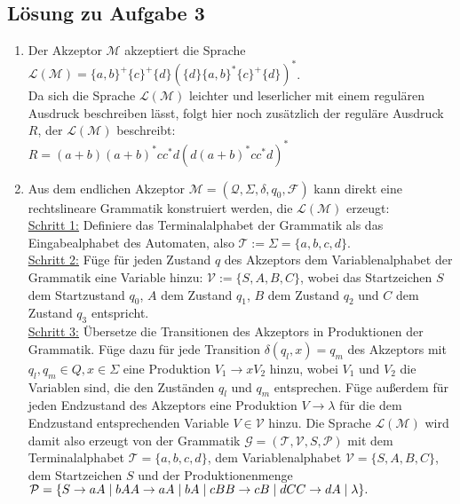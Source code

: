 \documentclass[10pt,oneside,onecolumn,a4paper,german,titlepage]{article}
\begin{document}
\subsection*{Lösung zu Aufgabe 3}
\begin{enumerate}
\item Der Akzeptor $\mathcal{M}$ akzeptiert die Sprache $\mathcal{L}(\mathcal{M}) =
\{a,b\}^+\{c\}^+\{d\}(\{d\}\{a,b\}^*\{c\}^+\{d\})^*$.\\[10pt]
Da sich die Sprache $\mathcal{L}(\mathcal{M})$ leichter und leserlicher mit einem
regulären Ausdruck beschreiben lässt, folgt hier noch zusätzlich der reguläre
Ausdruck $R$, der $\mathcal{L}(\mathcal{M})$ beschreibt:\\
$R = (a+b)(a+b)^*cc^*d(d(a+b)^*cc^*d)^*$

\item Aus dem endlichen Akzeptor $\mathcal{M} = (\mathcal{Q},\Sigma,\delta,q_0,
\mathcal{F})$ kann direkt eine rechtslineare Grammatik konstruiert werden, die
$\mathcal{L}(\mathcal{M})$ erzeugt:\\
\underline{Schritt 1:} Definiere  das Terminalalphabet der Grammatik als das
Eingabealphabet des Automaten, also $\mathcal{T} := \Sigma = \{a,b,c,d\}$.\\
\underline{Schritt 2:} Füge für jeden Zustand $q$ des Akzeptors dem Variablenalphabet
der Grammatik eine Variable hinzu: $\mathcal{V} := \{S,A,B,C\}$, wobei das
Startzeichen $S$ dem Startzustand $q_0$, $A$ dem Zustand $q_1$, $B$ dem Zustand $q_2$
und $C$ dem Zustand $q_3$ entspricht.\\
\underline{Schritt 3:} Übersetze die Transitionen des Akzeptors in Produktionen der
Grammatik. Füge dazu für jede Transition $\delta(q_l,x)=q_m$ des Akzeptors mit 
$q_l,q_m \in Q, x \in \Sigma$ eine Produktion $V_1 \rightarrow xV_2$ hinzu,
wobei $V_1$ und $V_2$ die Variablen sind, die den Zuständen $q_l$ und $q_m$
entsprechen. Füge außerdem für jeden Endzustand des Akzeptors eine Produktion
$V \rightarrow \lambda$ für die dem Endzustand entsprechenden Variable $V \in
\mathcal{V}$ hinzu.
Die Sprache $\mathcal{L}(\mathcal{M})$ wird damit also erzeugt von der Grammatik
$\mathcal{G} = (\mathcal{T},\mathcal{V},S,\mathcal{P})$ mit dem Terminalalphabet
$\mathcal{T} = \{a,b,c,d\}$, dem Variablenalphabet $\mathcal{V} = \{S,A,B,C\}$,
dem Startzeichen $S$ und der Produktionenmenge\\
$\mathcal{P} = \{S \rightarrow aA \; | \; bA\\
A \rightarrow aA \; | \; bA \; | \; cB\\
B \rightarrow cB \; | \; dC\\
C \rightarrow dA \; | \; \lambda\}.$
\end{enumerate}
\end{document}

